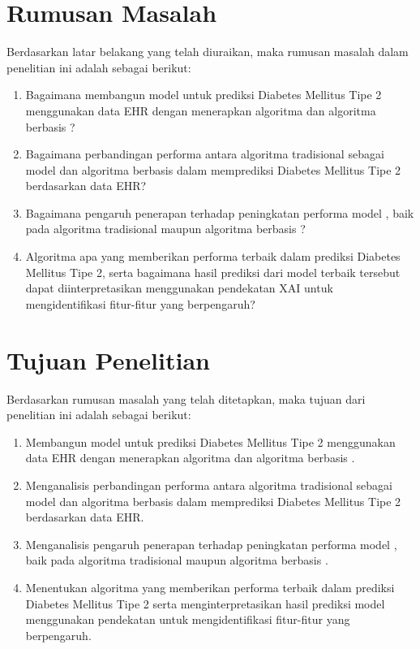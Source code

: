 \section{Rumusan Masalah}
Berdasarkan latar belakang yang telah diuraikan, maka rumusan masalah dalam penelitian ini adalah sebagai berikut:
\begin{enumerate}
\item Bagaimana membangun model  untuk prediksi Diabetes Mellitus Tipe 2 menggunakan data EHR dengan menerapkan algoritma  dan algoritma berbasis ?
\item Bagaimana perbandingan performa antara algoritma  tradisional sebagai model  dan algoritma berbasis  dalam memprediksi Diabetes Mellitus Tipe 2 berdasarkan data EHR?
\item Bagaimana pengaruh penerapan  terhadap peningkatan performa model , baik pada algoritma tradisional maupun algoritma berbasis ?
\item Algoritma  apa yang memberikan performa terbaik dalam prediksi Diabetes Mellitus Tipe 2, serta bagaimana hasil prediksi dari model terbaik tersebut dapat diinterpretasikan menggunakan pendekatan XAI untuk mengidentifikasi fitur-fitur yang berpengaruh?
\end{enumerate}

\section{Tujuan Penelitian}
Berdasarkan rumusan masalah yang telah ditetapkan, maka tujuan dari penelitian ini adalah sebagai berikut:
\begin{enumerate}
\item Membangun model  untuk prediksi Diabetes Mellitus Tipe 2 menggunakan data EHR dengan menerapkan algoritma  dan algoritma berbasis .
\item Menganalisis perbandingan performa antara algoritma  tradisional sebagai model  dan algoritma berbasis  dalam memprediksi Diabetes Mellitus Tipe 2 berdasarkan data EHR.
\item Menganalisis pengaruh penerapan  terhadap peningkatan performa model , baik pada algoritma tradisional maupun algoritma berbasis .
\item Menentukan algoritma  yang memberikan performa terbaik dalam prediksi Diabetes Mellitus Tipe 2 serta menginterpretasikan hasil prediksi model menggunakan pendekatan  untuk mengidentifikasi fitur-fitur yang berpengaruh.
\end{enumerate}

